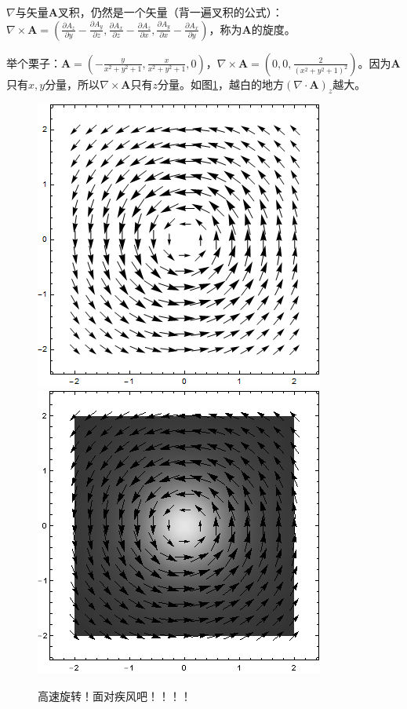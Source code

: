$\nabla$与矢量$\mathbf{A}$叉积，仍然是一个矢量（背一遍叉积的公式）：$\nabla \times \mathbf{A}=(\frac{\partial A_z}{\partial y}-\frac{\partial A_y}{\partial z},\frac{\partial A_x}{\partial z}-\frac{\partial A_z}{\partial x},\frac{\partial A_y}{\partial x}-\frac{\partial A_x}{\partial y})$，称为$\mathbf{A}$的旋度。

举个栗子：$\mathbf{A}=(-\frac{y}{x^2+y^2+1},\frac{x}{x^2+y^2+1},0)$，$\nabla \times \mathbf{A}=(0,0,\frac{2}{(x^2+y^2+1)^2})$。因为$\mathbf{A}$只有$x,y$分量，所以$\nabla \times \mathbf{A}$只有$z$分量。如图\ref{fig-vec-curl}，越白的地方$(\nabla \cdot \mathbf{A})_z$越大。
\begin{figure}[htb]
\centering
\includegraphics[scale=0.5]{fig/vec-curl.png}
\includegraphics[scale=0.5]{fig/vec-curl-2.png}
\caption{高速旋转！面对疾风吧！！！！}
\label{fig-vec-curl}
\end{figure}

